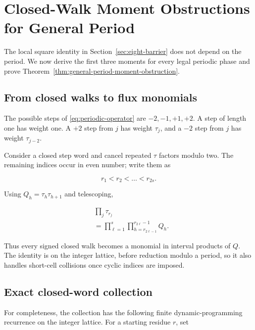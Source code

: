 \section{Closed-Walk Moment Obstructions for General Period}\label{sec:general-period}

The local square identity in Section~\ref{sec:eight-barrier} does not depend on the period. We now
derive the first three moments for every legal periodic phase and prove
Theorem~\ref{thm:general-period-moment-obstruction}.

\subsection{From closed walks to flux monomials}

The possible steps of \eqref{eq:periodic-operator} are \(-2,-1,+1,+2\). A step of length one has
weight one. A \(+2\) step from \(j\) has weight \(\tau_j\), and a \(-2\) step from
\(j\) has weight \(\tau_{j-2}\).

Consider a closed step word and cancel repeated \(\tau\) factors modulo two.
The remaining indices occur in even number; write them as

\begin{equation}
r_{1}<r_{2}<\ldots<r_{2s}.
\end{equation}

Using \(Q_h=\tau_h \tau_{h+1}\) and telescoping,

\begin{equation}
\label{eq:tau-product-from-flux}
\begin{aligned}
&\prod_j \tau_{r_j} \\
&=\prod_{\ell=1}^{s}\prod_{h=r_{2\ell-1}}^{r_{2\ell}-1}Q_h.
\end{aligned}
\end{equation}

Thus every signed closed walk becomes a monomial in interval products of \(Q\).
The identity is on the integer lattice, before reduction modulo a period, so
it also handles short-cell collisions once cyclic indices are imposed.

\subsection{Exact closed-word collection}

For completeness, the collection has the following finite dynamic-programming
recurrence on the integer lattice. For a starting residue \(r\), set

